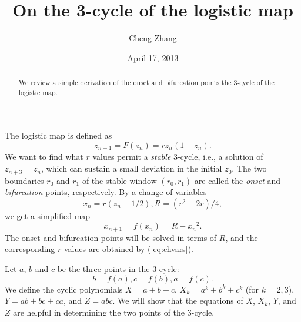 \documentclass[twocolumn,prl]{revtex4-1}
\begin{document}
\title{On the 3-cycle of the logistic map}
\author{Cheng Zhang}
\date{April 17, 2013}
\begin{abstract}
We review a simple derivation of
  the onset and bifurcation points the 3-cycle
  of the logistic map.
\end{abstract}
\maketitle


The logistic map is defined as
\[
  z_{n+1} = F(z_n) = r z_n (1 - z_n).
\]
We want to find what $r$ values permit a \emph{stable} 3-cycle,
i.e., a solution of $z_{n+3} = z_n$,
which can sustain a small deviation in the initial $z_0$.
The two boundaries $r_0$ and $r_1$
  of the stable window $(r_0, r_1)$
  are called the \emph{onset} and \emph{bifurcation} points, respectively.
%
By a change of variables
\begin{equation}
  x_n = r (z_n - 1/2),
  R = (r^2 - 2 r)/4,
\label{eq:chvars}
\end{equation}
we get a simplified map
\[
x_{n+1} = f(x_n) = R - {x_n}^2.
\]
The onset and bifurcation points will be solved
  in terms of $R$, and the corresponding $r$ values
  are obtained by (\ref{eq:chvars}).


Let $a$, $b$ and $c$ be the three points in the 3-cycle:
\begin{equation}
  b=f(a), c=f(b), a=f(c).
\label{eq:abc}
\end{equation}
We define the cyclic polynomials
$X = a+b+c$,
$X_k = a^k+b^k+c^k$ (for $k = 2,3$),
$Y = ab+bc+ca$, and $Z = abc$.
We will show that the equations of $X$, $X_k$, $Y$, and $Z$
are helpful in determining the two points of the 3-cycle.
\end{document}
